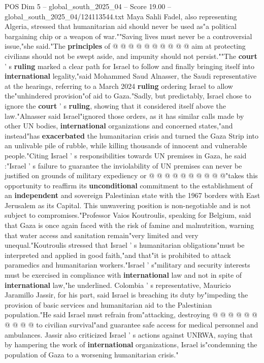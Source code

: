 \begin{textsample}{POS Dim 5 – global\_south\_2025\_04 – Score 19.00 – global\_south\_2025\_04/124113544.txt}
Maya Sahli Fadel, also representing Algeria, stressed that humanitarian aid should never be used as"a political bargaining chip or a weapon of war.""Saving lives must never be a controversial issue,"she said."The \textbf{principles} of @ @ @ @ @ @ @ @ @ @ aim at protecting civilians should not be swept aside, and impunity should not persist.""The \textbf{court} ' s \textbf{ruling} marked a clear path for Israel to follow and finally bringing itself into \textbf{international} legality,"said Mohammed Saud Alnasser, the Saudi representative at the hearings, referring to a March 2024 \textbf{ruling} ordering Israel to allow the"unhindered provision"of aid to Gaza."Sadly, but predictably, Israel chose to ignore the \textbf{court} ' s \textbf{ruling}, showing that it considered itself above the law."Alnasser said Israel"ignored those orders, as it has similar calls made by other UN bodies, \textbf{international} organizations and concerned states,"and instead"has \textbf{exacerbated} the humanitarian crisis and turned the Gaza Strip into an unlivable pile of rubble, while killing thousands of innocent and vulnerable people."Citing Israel ' s responsibilities towards UN premises in Gaza, he said :"Israel ' s failure to guarantee the inviolability of UN premises can never be justified on grounds of military expediency or @ @ @ @ @ @ @ @ @ @"takes this opportunity to reaffirm its \textbf{unconditional} commitment to the establishment of an \textbf{independent} and sovereign Palestinian state with the 1967 borders with East Jerusalem as its Capital.
This unwavering position is non-negotiable and is not subject to compromises."Professor Vaios Koutroulis, speaking for Belgium, said that Gaza is once again faced with the risk of famine and malnutrition, warning that water access and sanitation remain"very limited and very unequal."Koutroulis stressed that Israel ' s humanitarian obligations"must be interpreted and applied in good faith,"and that"it is prohibited to attack paramedics and humanitarian workers."Israel ' s"military and security interests must be exercised in compliance with \textbf{international} law and not in spite of \textbf{international} law,"he underlined.
Colombia ' s representative, Mauricio Jaramillo Jassir, for his part, said Israel is breaching its duty by"impeding the provision of basic services and humanitarian aid to the Palestinian population."He said Israel must refrain from"attacking, destroying @ @ @ @ @ @ @ @ @ @ to civilian survival"and guarantee safe access for medical personnel and ambulances.
Jassir also criticized Israel ' s actions against UNRWA, saying that by hampering the work of \textbf{international} organizations, Israel is"condemning the population of Gaza to a worsening humanitarian crisis."

\end{textsample}

